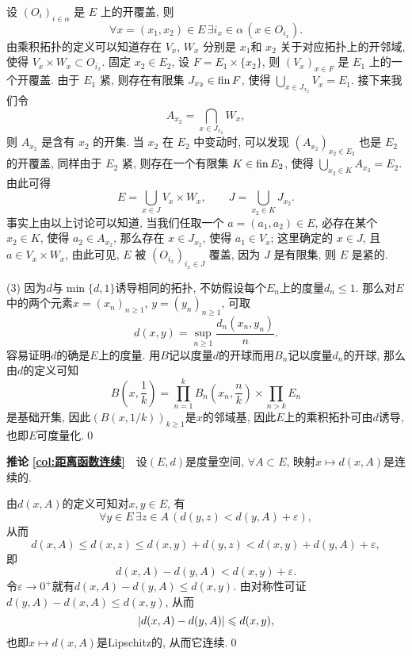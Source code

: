 \begin{appendix}
\begin{Proof}
	设 $ (O_{i})_{i\in\alpha} $ 是 $ E $ 上的开覆盖, 则
	\[
		\forall x=(x_{1}, x_{2})\in E\,\exists i_{x}\in\alpha\,(x\in O_{i_{x}}).
	\]
	由乘积拓扑的定义可以知道存在 $ V_{x} $, $ W_{x} $ 分别是 $ x_{1} $和 $ x_{2} $ 关于对应拓扑上的开邻域, 使得 $ V_{x}\times W_{x}\subset O_{i_{x}} $. 固定 $ x_{2}\in E_{2} $, 设 $ F=E_{1}\times \{ x_{2} \} $, 则 $ (V_{x})_{x\in F} $ 是 $ E_{1} $ 上的一个开覆盖. 由于 $ E_{1} $ 紧, 则存在有限集 $ J_{x_{2}}\in \operatorname{fin} F $, 使得 $ \bigcup_{x\in J_{x_{2}}}V_{x}=E_{1} $. 接下来我们令
	\[
		A_{x_{2}}=\bigcap_{x\in J_{x_{2}}}W_{x},
	\]
	则 $ A_{x_{2}} $ 是含有 $ x_{2} $ 的开集. 当 $ x_{2} $ 在 $ E_{2} $ 中变动时, 可以发现 $ (A_{x_{2}})_{x_{2}\in E_{2}} $ 也是 $ E_{2} $ 的开覆盖, 同样由于 $ E_{2} $ 紧, 则存在一个有限集 $ K\in\operatorname{fin} E_{2} $, 使得 $ \bigcup_{x_{2}\in K}A_{x_{2}}=E_{2} $. 由此可得
	\[
		E=\bigcup_{x\in J} V_{x}\times W_{x},\qquad J=\bigcup_{x_{2}\in K}J_{x_{2}}.
	\]
	事实上由以上讨论可以知道, 当我们任取一个 $ a=(a_{1}, a_{2})\in E $, 必存在某个 $ x_{2}\in K $, 使得 $ a_{2}\in A_{x_{2}} $, 那么存在 $ x\in J_{x_{2}} $, 使得 $ a_{1}\in V_{x} $; 这里确定的 $ x\in J $, 且 $ a\in V_{x}\times W_{x} $, 由此可见,  $ E $ 被 $ (O_{i_{x}})_{i_{x}\in J} $ 覆盖, 因为 $ J $ 是有限集, 则 $ E $ 是紧的.
	
	(3) 因为$ d $与$ \min\{d,1\} $诱导相同的拓扑, 不妨假设每个$ E_n $上的度量$ d_n\leqslant 1 $. 那么对$ E $中的两个元素$ x=(x_n)_{n\geqslant 1} $, $ y=(y_n)_{n\geqslant 1} $, 可取
	\[
	d(x,y)=\sup_{n\geqslant 1}\frac{d_n(x_n,y_n)}{n}.
	\]
	容易证明$ d $的确是$ E $上的度量. 用$ B $记以度量$ d $的开球而用$ B_n $记以度量$ d_n $的开球, 那么由$ d $的定义可知
	\[
	B\left(x,\frac{1}{k}\right)=\prod_{n=1}^kB_n\left(x_n,\frac{n}{k}\right)\times\prod_{n>k}E_n
	\]
	是基础开集, 因此$ (B(x,1/k))_{k\geqslant 1} $是$ x $的邻域基, 因此$ E $上的乘积拓扑可由$ d $诱导, 也即$ E $可度量化.\qed
	     
	\end{Proof}
	
	\textbf{推论\,\,\ref{col:距离函数连续}}\ \ 设$ (E,d) $是度量空间, $ \forall A\subset E $, 映射$ x\mapsto d(x,A) $是连续的.
	\begin{Proof}
	由$ d(x,A) $的定义可知对$ x,y\in E $, 有
	\[
	\forall y\in E\,\exists z\in A\,(d(y,z)<d(y,A)+\varepsilon),
	\]
	从而
	\[
	d(x,A)\leqslant d(x,z)\leqslant d(x,y)+d(y,z)<d(x,y)+d(y,A)+\varepsilon,
	\]
	即
	\[
	d(x,A)-d(y,A)<d(x,y)+\varepsilon.
	\]
	令$ \varepsilon\to 0^+ $就有$ d(x,A)-d(y,A)\leqslant d(x,y) $. 由对称性可证$ d(y,A)-d(x,A)\leqslant d(x,y) $, 从而
	\[
	\left| d(x,A)-d(y,A) \right| \leqslant d(x,y),
	\]
	也即$ x\mapsto d(x,A) $是Lipschitz的, 从而它连续.\qed
	\end{Proof}
	
	
	
	
	
\end{appendix}